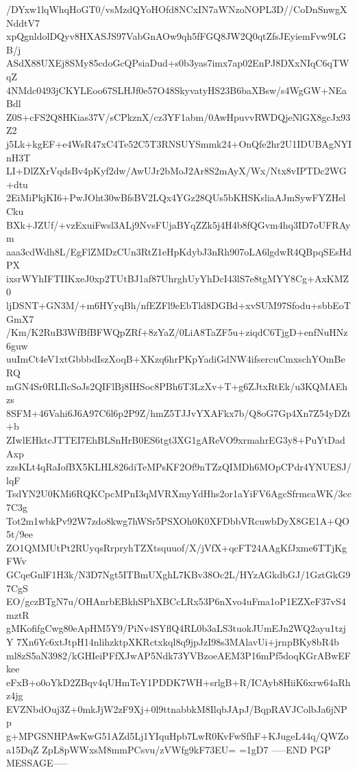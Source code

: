 /DYxw1lqWhqHoGT0/vsMzdQYoHOfd8NCxIN7aWNzoNOPL3D//CoDnSnwgXNddtV7
xpQgnldolDQyv8HXASJS97VabGnAOw9qh5fFGQ8JW2Q0qtZfsJEyiemFvw9LGB/j
ASdX88UXEj8SMy85cdoGcQPsiaDud+s0b3yas7imx7ap02EnPJ8DXxNIqC6qTWqZ
4NMdc0493jCKYLEoo67SLHJf0e57O48SkyvatyHS23B6baXBsw/s4WgGW+NEaBdl
Z0S+cFS2Q8HKias37V/sCPkznX/cz3YF1abm/0AwHpuvvRWDQjeNlGX8gcJx93Z2
j5Lk+kgEF+e4WsR47xC4Te52C5T3RNSUYSmmk24+OnQfe2hr2U1IDUBAgNYInH3T
LI+DlZXrVqdsBv4pKyf2dw/AwUJr2bMoJ2Ar8S2mAyX/Wx/Ntx8vIPTDc2WG+dtu
2EiMiPkjKI6+PwJOht30wBfsBV2LQx4YGz28QUs5bKHSKsliaAJmSywFYZHelCku
BXk+JZUf/+vzExuiFwsl3ALj9NvsFUjaBYqZZk5j4H4b8fQGvm4hq3ID7oUFRAym
aaa3cdWdh8L/EgFlZMDzCUn3RtZ1eHpKdybJ3nRh907oLA6lgdwR4QBpqSEsHdPX
ixsrWYhIFTIIKxeJ0xp2TUtBJ1af87UhrghUyYhDcI43lS7e8tgMYY8Cg+AxKMZ0
ljDSNT+GN3M/+m6HYyqBh/nfEZFl9eEbTld8DGBd+xvSUM97Sfodu+sbbEoTGmX7
/Km/K2RuB3WfBfBFWQpZRf+8zYaZ/0LiA8TaZF5u+ziqdC6TjgD+enfNuHNz6guw
uuImCt4eV1xtGbbbdIszXoqB+XKzq6hrPKpYadiGdNW4ifsercuCmxschYOmBeRQ
mGN4Sr0RLIlcSoJs2QIFlBj8IHSoc8PBh6T3LzXv+T+g6ZJtxRtEk/u3KQMAEhzs
8SFM+46Vahi6J6A97C6l6p2P9Z/hmZ5TJJvYXAFkx7b/Q8oG7Gp4Xn7Z54yDZt+b
ZIwlEHktcJTTEI7EhBLSnHrB0ES6tgt3XG1gAReVO9xrmahrEG3y8+PuYtDadAxp
zzsKLt4qRaIofBX5KLHL826diTeMPsKF2Of9nTZzQIMDh6MOpCPdr4YNUESJ/lqF
TsdYN2U0KMi6RQKCpcMPnI3qMVRXmyYdHhs2or1aYiFV6AgcSfrmcaWK/3cc7C3g
Tot2m1wbkPv92W7zdo8kwg7hWSr5PSXOh0K0XFDbbVRcuwbDyX8GE1A+QO5t/9ee
ZO1QMMUtPt2RUyqsRrpryhTZXtsquuof/X/jVfX+qcFT24AAgKfJxme6TTjKgFWv
GCqeGnlF1H3k/N3D7Ngt5ITBmUXghL7KBv38Oc2L/HYzAGkdbGJ/1GztGkG97CgS
EO/gczBTgN7u/OHAnrbEBkhSPhXBCcLRx53P6nXvo4uFma1oP1EZXeF37vS4mztR
gMKofifgCwg80eApHM5Y9/PiNv4SYflQ4RL0b3aLS3tuokJUmEJn2WQ2ayu1tzjY
7Xn6Yc6xtJtpH14nlihzktpXKRctxkql8q9jpJzI98s3MAlavUi+jrnpBKy8bR4b
ml8zS5aN3982/kGHIeiPFfXJwAP5Ndk73YVBzoeAEM3P16mPf5doqKGrABwEFkee
eFxB+o0oYkD2ZBqv4qUHmTeY1PDDK7WH+srlgB+R/ICAyb8HiiK6xrw64aRhz4jg
EVZNbdOuj3Z+0mkJjW2zF9Xj+0l9ttnabbkM8IlqbJApJ/BqpRAVJColbJa6jNPp
g+MPGSNHPAwKwG51AZd5Lj1YIquHpb7LwR0KvFwSfhF+KJugeL44q/QWZoa15DqZ
ZpL8pWWxsM8mmPCsvu/zVWfg9kF73EU=
=1gD7
-----END PGP MESSAGE-----
